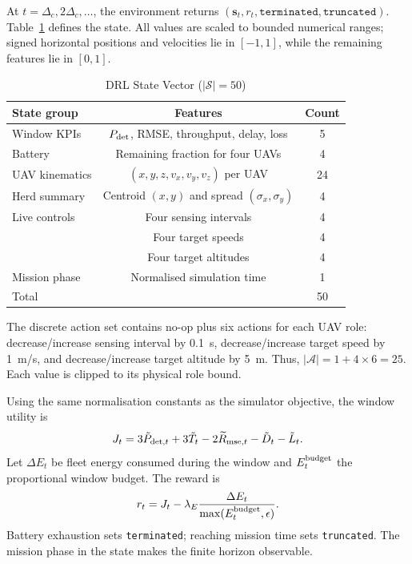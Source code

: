 \documentclass[10pt,conference]{IEEEtran}
\begin{document}
At $t=\Delta_c,2\Delta_c,\ldots$, the environment returns
$(\mathbf s_t,r_t,\mathtt{terminated},\mathtt{truncated})$. Table~\ref{tab:state}
defines the state. All values are scaled to bounded numerical ranges; signed
horizontal positions and velocities lie in $[-1,1]$, while the remaining
features lie in $[0,1]$.

\begin{table}[t]
\caption{DRL State Vector ($|\mathcal S|=50$)}
\label{tab:state}
\centering
\scriptsize
\begin{tabular}{lcc}
\toprule
State group & Features & Count\\
\midrule
Window KPIs & $P_{\rm det}$, RMSE, throughput, delay, loss & 5\\
Battery & Remaining fraction for four UAVs & 4\\
UAV kinematics & $(x,y,z,v_x,v_y,v_z)$ per UAV & 24\\
Herd summary & Centroid $(x,y)$ and spread $(\sigma_x,\sigma_y)$ & 4\\
Live controls & Four sensing intervals & 4\\
 & Four target speeds & 4\\
 & Four target altitudes & 4\\
Mission phase & Normalised simulation time & 1\\
\midrule
Total & & 50\\
\bottomrule
\end{tabular}
\end{table}

The discrete action set contains no-op plus six actions for each UAV role:
decrease/increase sensing interval by 0.1~s, decrease/increase target speed by
1~m/s, and decrease/increase target altitude by 5~m. Thus,
$|\mathcal A|=1+4\times6=25$. Each value is clipped to its physical role bound.

Using the same normalisation constants as the simulator objective, the window
utility is
\begin{equation}
J_t=3\tilde P_{{\rm det},t}+3\tilde T_t-2\widetilde{R}_{{\rm mse},t}
-\tilde D_t-\tilde L_t.
\end{equation}
Let $\Delta E_t$ be fleet energy consumed during the window and
$E_t^{\rm budget}$ the proportional window budget. The reward is
\begin{equation}
r_t=J_t-\lambda_E\frac{\Delta E_t}{\max(E_t^{\rm budget},\epsilon)}.
\label{eq:reward}
\end{equation}
Battery exhaustion sets \texttt{terminated}; reaching mission time sets
\texttt{truncated}. The mission phase in the state makes the finite horizon
observable.
\end{document}
